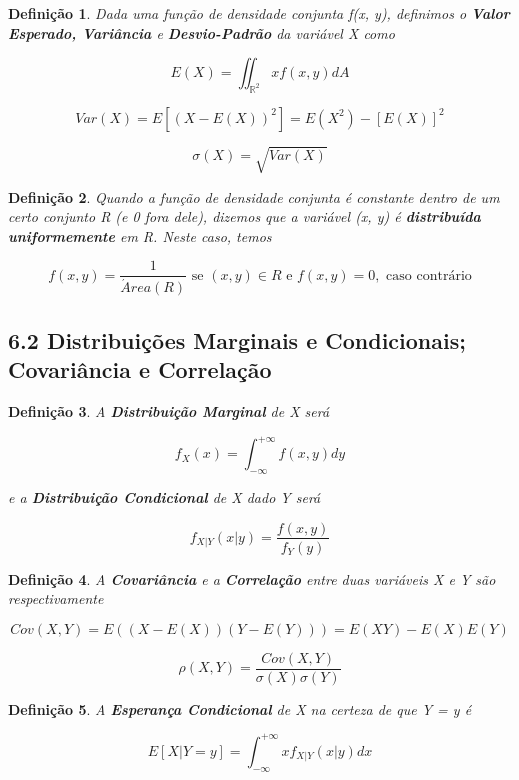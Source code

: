 \documentclass[12pt]{article}
\newtheorem{definition}{Definição}
\begin{document}
\begin{definition}
    Dada uma função de densidade conjunta f(x, y), definimos o \textbf{Valor Esperado, Variância} e \textbf{Desvio-Padrão} da variável X como
    
    $$E(X) = \iint_{\mathbb{R}^2} x f(x, y) dA$$
    
    $$Var(X) = E \left [ (X - E(X))^2 \right ] = E(X^2) - [E(X)]^2$$
    
    $$\sigma(X) = \sqrt{Var(X)}$$
\end{definition}

\begin{definition}
    Quando a função de densidade conjunta é constante dentro de um certo conjunto R (e 0 fora dele), dizemos que a variável (x, y) é \textbf{distribuída uniformemente} em R. Neste caso, temos
    
    $$f(x, y) = \frac{1}{\acute{A}rea(R)} \text{ se } (x, y) \in R \text{ e } f(x, y) = 0, \text{ caso contrário}$$
\end{definition}

\subsection*{6.2 Distribuições Marginais e Condicionais; Covariância e Correlação}
\label{s28}

\begin{definition}
    A \textbf{Distribuição Marginal} de X será
    
    $$f_X(x) = \int_{- \infty}^{+ \infty} f(x, y) d y$$
    
    e a \textbf{Distribuição Condicional} de X dado Y será
    
    $$f_{X | Y} (x | y) = \dfrac{f(x, y)}{f_Y(y)}$$
\end{definition}

\begin{definition}
    A \textbf{Covariância} e a \textbf{Correlação} entre duas variáveis X e Y são respectivamente 
    
    $$Cov(X, Y) = E((X - E(X))(Y - E(Y))) = E(XY) - E(X) E(Y)$$
    
    $$\rho(X, Y) = \dfrac{Cov(X, Y)}{\sigma(X) \sigma(Y)}$$
\end{definition}

\begin{definition}
    A \textbf{Esperança Condicional} de X na certeza de que Y = y é 
    
    $$E[X | Y = y] = \int_{- \infty}^{+ \infty} x f_{X | Y} (x | y) dx$$
\end{definition}
\end{document}
